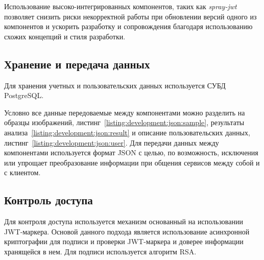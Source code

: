 Использование высоко-интегрированных компонентов, таких как \emph{spray-jwt} позволяет снизить риски некорректной работы при обновлении версий одного из компонентов и ускорить разработку и сопровождения благодаря использованию схожих концепций и стиля разработки.

\subsection{Хранение и передача данных}
Для хранения учетных и пользовательских данных используется СУБД PostgreSQL.

Условно все данные передоваемые между компонентами можно разделить на образцы изображений, листинг~\ref{listing:development:json:sample}, результаты анализа~\ref{listing:development:json:result} и описание пользовательских данных, листинг~\ref{listing:development:json:user}. Для передачи данных между компонентами используется формат JSON с целью, по возможность, исключения или упрощает преобразование информации при общения сервисов между собой и с клиентом. 







\subsection{Контроль доступа}
\label{sec:development:access_control}
Для контроля доступа используется механизм основанный на использовании JWT-маркера. Основой данного подхода является использование асинхронной криптографии для подписи и проверки JWT-маркера и доверее информации хранящейся в нем. Для подписи используется алгоритм RSA.

